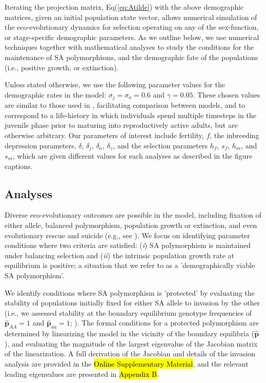 \documentclass[11pt,draft]{article}
\def\mbf#1{\mathbf{#1}}
\begin{document}
Iterating the projection matrix, Eq(\ref{eq:Atilde}) with the above demographic matrices, given an initial population state vector, allows numerical simulation of the eco-evolutionary dynamics for selection operating on any of the sex-function, or stage-specific demographic parameters. As we outline below, we use numerical techniques together with mathematical analyses to study the conditions for the maintenance of SA polymorphisms, and the demographic fate of the populations (i.e., positive growth, or extinction).

Unless stated otherwise, we use the following parameter values for the demographic rates in the model: $\sigma_j = \sigma_a = 0.6$ and $\gamma = 0.05$. These chosen values are similar to those used in \citet{deVriesCaswell2019b}, facilitating comparison between models, and to correspond to a life-history in which individuals spend multiple timesteps in the juvenile phase prior to maturing into reproductively active adults, but are otherwise arbitrary. Our parameters of interest include fertility, $f$, the inbreeding depression parameters, $\delta$, $\delta_j$, $\delta_a$, $\delta_{\gamma}$, and the selection parameters $h_f$, $s_f$, $h_m$, and $s_m$, which are given different values for each analyses as described in the figure captions. 

\subsection*{Analyses} \label{subsec:analyses}

Diverse eco-evolutionary outcomes are possible in the model, including fixation of either allele, balanced polymorphism, population growth or extinction, and even evolutionary rescue and suicide (e.g., see \citealt{deVriesCaswell2019a,deVriesCaswell2019b}). We focus on identifying parameter conditions where two criteria are satisfied: ({\itshape i}) SA polymorphism is maintained under balancing selection and ({\itshape ii}) the intrinsic population growth rate at equilibrium is positive; a situation that we refer to as a 'demographically viable SA polymorphism'.

We identify conditions where SA polymorphism is 'protected' by evaluating the stability of populations initially fixed for either SA allele to invasion by the other (i.e., we assessed stability at the boundary equilibrium genotype frequencies of $\hat{\mbf{p}}_{AA} = 1$ and $\hat{\mbf{p}}_{aa} = 1$; \citealt{Levene1953, Prout1968, deVriesCaswell2019b}). The formal conditions for a protected polymorphism are determined by linearizing the model in the vicinity of the boundary equilibria ($\hat{\mbf{p}}$), and evaluating the magnitude of the largest eigenvalue of the Jacobian matrix of the linearization. A full derivation of the Jacobian and details of the invasion analysis are provided in the \hl{Online Supplementary Material}, and the relevant leading eigenvalues are presented in \hl{Appendix B}.
\end{document}
